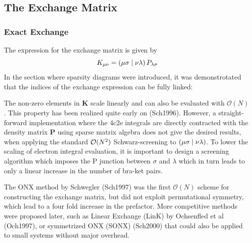 \subsection{The Exchange Matrix}

\subsubsection{Exact Exchange}

The expression for the exchange matrix is given by 
\begin{equation}
K_{\mu\nu} = \left( \mu\sigma \mid \nu\lambda \right) P_{\lambda\sigma}
\end{equation}
\noindent In the section where sparsity diagrams were introduced, it was demonstrotated that the indices of the exchange expression can be fully linked:
\begin{center}
\end{center}
\noindent The non-zero elements in $\mathbf{K}$ scale linearly and can also be evaluated with $\mathcal{O}(N)$. This property has been realized quite early on (Sch1996). However, a straight-forward implementation where the 4c2e integrals are directly contracted with the density matrix $\mathbf{P}$ using sparse matrix algebra does not give the desired results, when applying the standard $\mathcal{O}(N^{2})$ Schwarz-screening to $\left( \mu\sigma \mid \nu\lambda \right)$. To lower the scaling of electron integral evaluation, it is important to design a screening algorithm which imposes the P junction between $\sigma$ and $\lambda$ which in turn leads to only a linear increase in the number of bra-ket pairs. 

The ONX method by Schwegler (Sch1997) was the first $\mathcal{O}(N)$ scheme for constructing the exchange matrix, but did not exploit permutational symmetry, which lead to a four fold increase in the prefactor. More competitive methods were proposed later, such as Linear Exchange (LinK) by Ochsenfled et al (Och1997), or symmetrized ONX (SONX) (Sch2000) that could also be applied to small systems without major overhead.

